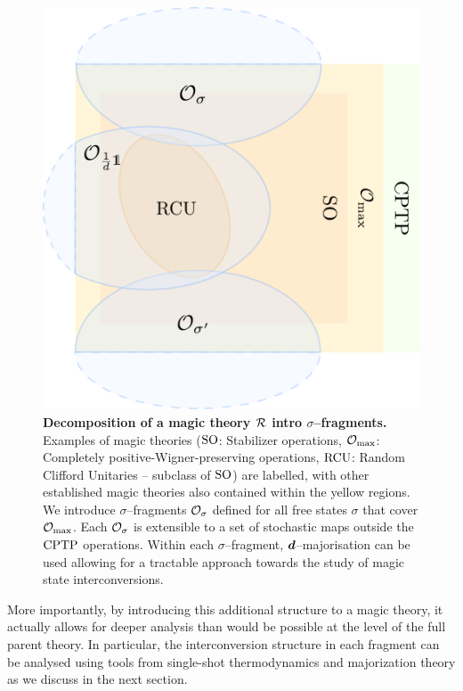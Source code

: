 \documentclass[pra,
aps,
twocolumn,
superscriptaddress,
groupedaddress,
nofootinbib,
reprint
]{revtex4-1}
\begin{document}
\begin{figure}[t]
    \centering
        \includegraphics[scale=0.3
        ]{figs/operations.pdf}
    \caption{\textbf{Decomposition of a magic theory $\mathcal{R}$ intro $\sigma$--fragments.} 
	Examples of magic theories (${\rm{SO}}$: Stabilizer operations, $\mathcal{O}_{\rm{max}}$: Completely positive-Wigner-preserving operations, ${\rm{RCU}}$: Random Clifford Unitaries -- subclass of ${\rm{SO}}$) are labelled, with other established magic theories also contained within the yellow regions.
    We introduce $\sigma$--fragments $\mathcal{O}_\sigma$ defined for all free states $\sigma$ that cover $\mathcal{O}_{\rm{max}}$. 
    Each $\mathcal{O}_\sigma$ is extensible to a set of stochastic maps outside the ${\rm{CPTP}}$ operations.
    Within each $\sigma$--fragment, $\bm{d}$--majorisation can be used allowing for a tractable approach towards the study of magic state interconversions.
    }
    \label{fig:zoo}
\end{figure}

More importantly, by introducing this additional structure to a magic theory, it actually allows for deeper analysis than would be possible at the level of the full parent theory. In particular, the interconversion structure in each fragment can be analysed using tools from single-shot thermodynamics and majorization theory as we discuss in the next section.
\end{document}
